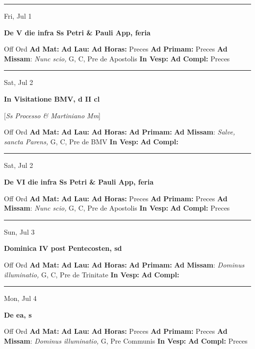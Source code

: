 \documentclass[letterpaper, 10pt]{article}
\begin{document}
\hrule
\begin{center}
Fri, Jul 1
\end{center}\textbf{ \large De V die infra Ss Petri \& Pauli App, \textnormal{\normalsize feria}}
\begin{justify}
Off Ord
\textbf{Ad Mat: }
\textbf{Ad Lau: }
\textbf{Ad Horas: }Preces
\textbf{Ad Primam: }Preces
\textbf{Ad Missam}: \textit{Nunc scio,} G, C, Pre de Apostolis
\textbf{In Vesp: }
\textbf{Ad Compl: }Preces\end{justify}



\hrule
\begin{center}
Sat, Jul 2
\end{center}\textbf{ \large In Visitatione BMV, \textnormal{\normalsize d II cl}}

[\textit{Ss Processo \& Martiniano Mm}]
\begin{justify}
Off Ord
\textbf{Ad Mat: }
\textbf{Ad Lau: }
\textbf{Ad Horas: }
\textbf{Ad Primam: }
\textbf{Ad Missam}: \textit{Salve, sancta Parens,} G, C, Pre de BMV
\textbf{In Vesp: }
\textbf{Ad Compl: }\end{justify}



\hrule
\begin{center}
Sat, Jul 2
\end{center}\textbf{ \large De VI die infra Ss Petri \& Pauli App, \textnormal{\normalsize feria}}
\begin{justify}
Off Ord
\textbf{Ad Mat: }
\textbf{Ad Lau: }
\textbf{Ad Horas: }Preces
\textbf{Ad Primam: }Preces
\textbf{Ad Missam}: \textit{Nunc scio,} G, C, Pre de Apostolis
\textbf{In Vesp: }
\textbf{Ad Compl: }Preces\end{justify}



\hrule
\begin{center}
Sun, Jul 3
\end{center}\textbf{ \large Dominica IV post Pentecosten, \textnormal{\normalsize sd}}
\begin{justify}
Off Ord
\textbf{Ad Mat: }
\textbf{Ad Lau: }
\textbf{Ad Horas: }
\textbf{Ad Primam: }
\textbf{Ad Missam}: \textit{Dominus illuminatio,} G, C, Pre de Trinitate
\textbf{In Vesp: }
\textbf{Ad Compl: }\end{justify}



\hrule
\begin{center}
Mon, Jul 4
\end{center}\textbf{ \large De ea, \textnormal{\normalsize s}}
\begin{justify}
Off Ord
\textbf{Ad Mat: }
\textbf{Ad Lau: }
\textbf{Ad Horas: }Preces
\textbf{Ad Primam: }Preces
\textbf{Ad Missam}: \textit{Dominus illuminatio,} G, Pre Communis
\textbf{In Vesp: }
\textbf{Ad Compl: }Preces\end{justify}
\end{document}
